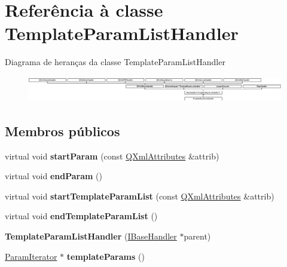 \hypertarget{class_template_param_list_handler}{\section{Referência à classe Template\-Param\-List\-Handler}
\label{class_template_param_list_handler}
}
Diagrama de heranças da classe Template\-Param\-List\-Handler\begin{figure}[H]
\begin{center}
\leavevmode
\includegraphics[height=1.134752cm]{class_template_param_list_handler}
\end{center}
\end{figure}
\subsection*{Membros públicos}
\begin{DoxyCompactItemize}
\item 
\hypertarget{class_template_param_list_handler_a0adc3c16cf5e35e11e1ef98e905b91e8}{virtual void {\bfseries start\-Param} (const \hyperlink{class_q_xml_attributes}{Q\-Xml\-Attributes} \&attrib)}\label{class_template_param_list_handler_a0adc3c16cf5e35e11e1ef98e905b91e8}

\item 
\hypertarget{class_template_param_list_handler_a79170d1fb476ff121b6b0aea57b409e4}{virtual void {\bfseries end\-Param} ()}\label{class_template_param_list_handler_a79170d1fb476ff121b6b0aea57b409e4}

\item 
\hypertarget{class_template_param_list_handler_a2de4ded6787264c3be9d44c1b532114b}{virtual void {\bfseries start\-Template\-Param\-List} (const \hyperlink{class_q_xml_attributes}{Q\-Xml\-Attributes} \&attrib)}\label{class_template_param_list_handler_a2de4ded6787264c3be9d44c1b532114b}

\item 
\hypertarget{class_template_param_list_handler_aed63efd221f19c6393c9793cdc757dac}{virtual void {\bfseries end\-Template\-Param\-List} ()}\label{class_template_param_list_handler_aed63efd221f19c6393c9793cdc757dac}

\item 
\hypertarget{class_template_param_list_handler_ab7197956667448d77931983eccdc151b}{{\bfseries Template\-Param\-List\-Handler} (\hyperlink{class_i_base_handler}{I\-Base\-Handler} $\ast$parent)}\label{class_template_param_list_handler_ab7197956667448d77931983eccdc151b}

\item 
\hypertarget{class_template_param_list_handler_a50bd8dbabe0d7fd129f35082aedf5166}{\hyperlink{class_param_iterator}{Param\-Iterator} $\ast$ {\bfseries template\-Params} ()}\label{class_template_param_list_handler_a50bd8dbabe0d7fd129f35082aedf5166}

\end{DoxyCompactItemize}
